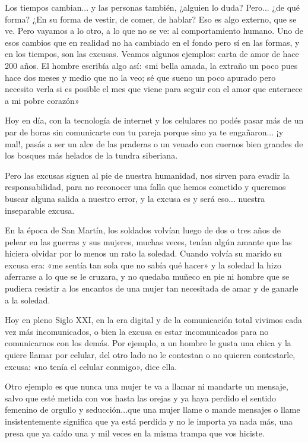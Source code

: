 \documentclass[11pt,twoside,openright,a5paper]{book}
\begin{document}
Los tiempos cambian... y las personas también, ¿alguien lo duda? Pero... ¿de qué forma? ¿En su forma de vestir, de comer, de hablar? Eso es algo externo, que se ve. Pero vayamos a lo otro, a lo que no se ve: al comportamiento humano. Uno de esos cambios que en realidad no ha cambiado en el fondo pero sí en las formas, y en los tiempos, son las excusas. Veamos algunos ejemplos: carta de amor de hace 200 años. El hombre escribía algo así: «mi bella amada, la extraño un poco pues hace dos meses y medio que no la veo; sé que sueno un poco apurado pero necesito verla si es posible el mes que viene para seguir con el amor que enternece a mi pobre corazón»

Hoy en día, con la tecnología de internet y los celulares no podés pasar más de un par de horas sin comunicarte con tu pareja porque sino ya te engañaron... ¡y mal!, pasás a ser un alce de las praderas o un venado con cuernos bien grandes de los bosques más helados de la tundra siberiana.

Pero las excusas siguen al pie de nuestra humanidad, nos sirven para evadir la responsabilidad, para no reconocer una falla que hemos cometido y queremos buscar alguna salida a nuestro error, y la excusa es y será eso... nuestra inseparable excusa.

En la época de San Martín, los soldados volvían luego de dos o tres años de pelear en las guerras y sus mujeres, muchas veces, tenían algún amante que las hiciera olvidar por lo menos un rato la soledad. Cuando volvía su marido su excusa era: «me sentía tan sola que no sabía qué hacer» y la soledad la hizo aferrarse a lo que se le cruzara, y no quedaba muñeco en pie ni hombre que se pudiera resistir a los encantos de una mujer tan necesitada de amar y de ganarle a la soledad.

Hoy en pleno Siglo XXI, en la era digital y de la comunicación total vivimos cada vez más incomunicados, o bien la excusa es estar incomunicados para no comunicarnos con los demás. Por ejemplo, a un hombre le gusta una chica y la quiere llamar por celular, del otro lado no le contestan o no quieren contestarle, excusa: «no tenía el celular conmigo», dice ella.

Otro ejemplo es que nunca una mujer te va a llamar ni mandarte un mensaje, salvo que esté metida con vos hasta las orejas y ya haya perdido el sentido femenino de orgullo y seducción...que una mujer llame o mande mensajes o llame insistentemente significa que ya está perdida y no le importa ya  nada más, una presa que ya caído una y mil veces en la misma trampa que vos hiciste.
\end{document}
